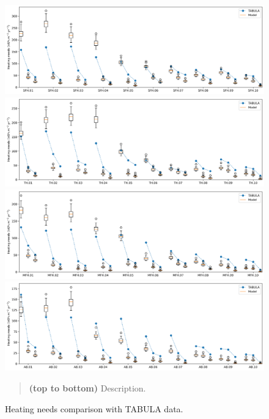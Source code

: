 \documentclass[11pt]{article}
\begin{document}
        \begin{figure}[ht]
            \centering
            \includegraphics[width=0.99\columnwidth]{figures/SFH_TABULA_consumption.png}
            \includegraphics[width=0.99\columnwidth]{figures/TH_TABULA_consumption.png}
            \includegraphics[width=0.99\columnwidth]{figures/MFH_TABULA_consumption.png}
            \includegraphics[width=0.99\columnwidth]{figures/AB_TABULA_consumption.png}
            \caption{\label{fig:tabula_verif} Heating needs comparison with TABULA data.}
                \begin{quote}
                    \vspace{-2mm}
                    \small\noindent
                    \textbf{(top to bottom)} Description. 
                \end{quote}
        \end{figure}  
\end{document}
